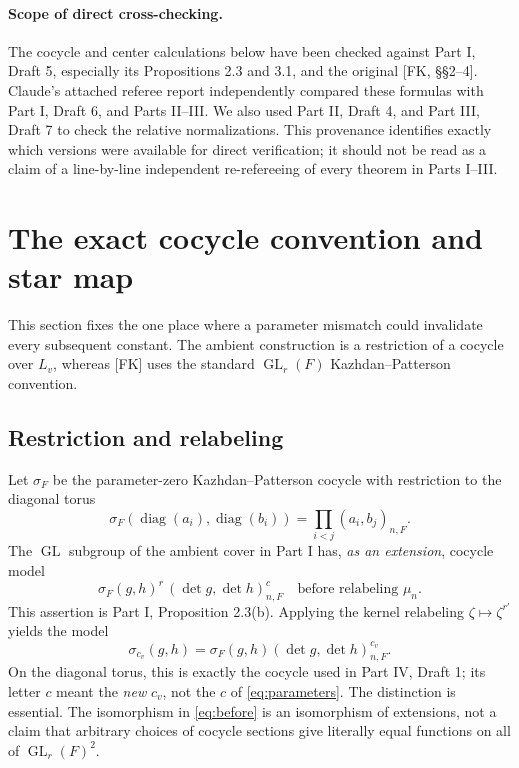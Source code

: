 \documentclass[11pt]{article}
\newcommand{\GL}{\operatorname{GL}}
\theoremstyle{plain}
\theoremstyle{definition}
\begin{document}
\paragraph{Scope of direct cross-checking.}
The cocycle and center calculations below have been checked against
Part I, Draft 5, especially its Propositions 2.3 and 3.1, and the
original [FK, \S\S2--4].  Claude's attached referee report independently
compared these formulas with Part I, Draft 6, and Parts II--III.
We also used Part II, Draft 4, and Part III, Draft 7 to check the
relative normalizations.  This provenance identifies exactly which
versions were available for direct verification; it should not be read
as a claim of a line-by-line independent re-refereeing of every theorem
in Parts I--III.

\section{The exact cocycle convention and star map}\label{sec:cocycle}
This section fixes the one place where a parameter mismatch could
invalidate every subsequent constant.  The ambient construction is
a restriction of a cocycle over $L_v$, whereas [FK] uses the standard
$\GL_r(F)$ Kazhdan--Patterson convention.

\subsection{Restriction and relabeling}
Let $\sigma_F$ be the parameter-zero Kazhdan--Patterson cocycle with
restriction to the diagonal torus
\begin{equation}\label{eq:parameterzero}
\sigma_F(\operatorname{diag}(a_i),\operatorname{diag}(b_i))
=\prod_{i<j}(a_i,b_j)_{n,F}.
\end{equation}
The $\GL$ subgroup of the ambient cover in Part I has, \emph{as an
extension}, cocycle model
\begin{equation}\label{eq:before}
  \sigma_F(g,h)^r\,(\det g,\det h)_{n,F}^{c}
  \quad\text{before relabeling }\mu_n.
\end{equation}
This assertion is Part I, Proposition 2.3(b).  Applying the
kernel relabeling $\zeta\mapsto\zeta^{r'}$ yields the model
\begin{equation}\label{eq:after}
 \sigma_{c_v}(g,h)=\sigma_F(g,h)
 (\det g,\det h)_{n,F}^{c_v}.
\end{equation}
On the diagonal torus, this is exactly the cocycle used in
Part IV, Draft 1; its letter $c$ meant the \emph{new} $c_v$,
not the $c$ of \eqref{eq:parameters}.  The distinction is essential.
The isomorphism in \eqref{eq:before} is an isomorphism of extensions,
not a claim that arbitrary choices of cocycle sections give
literally equal functions on all of $\GL_r(F)^2$.
\end{document}
